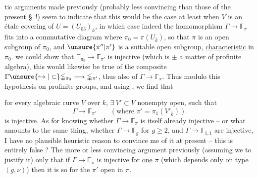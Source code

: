 
tic arguments made previously (probably less convincing than those of the present
\S~!) seem to indicate that this would be
the case at least when $V$ is an
étale covering of $U=(U_{03})_k$, in which
case indeed the homomorphism $\Gamma\longrightarrow\mathbb{\Gamma}_{\pi}$
fits into a commutative diagram
where $\pi_0=\pi(U_{\bar k})$, so that $\pi$ is an open subgroup of
$\pi_0$, and $\unsure{\pi''|\pi'}$ is a
suitable open subgroup, \uline{characteristic}
in $\pi_0$. \uline{} we could show that
$\mathbb{\Gamma}_{\pi_0}\longrightarrow\mathbb{\Gamma}_{\pi'}$ is injective
(which is $\pm$ a matter of profinite algebra), this would
likewise be true of the composite
$\Gamma\unsure{\hookrightarrow|\subset}\mathbb{\Gamma}_{\pi_0}
\longrightarrow\mathbb{\Gamma}_{\pi'}$,
thus also of $\Gamma\longrightarrow\mathbb{\Gamma}_{\pi}$.
Thus modulo this hypothesis on profinite groups,
and using , we find that

for every algebraic curve $V$ over $k$,
$\exists\ V'\subset V$ nonempty open, such that
\[
\Gamma\longrightarrow\mathbb{\Gamma}_{\pi'}
\qquad (\text{where }\pi'=\pi_1(V'_{\bar{k}}))
\]
is injective. As for knowing whether
$\Gamma\longrightarrow\mathbb{\Gamma}_{\pi}$ is itself already injective
-- or  what amounts to the same thing, whether
$\Gamma\longrightarrow\mathbb{\Gamma}_g$ for $g\geq 2$, and
$\Gamma\longrightarrow\mathbb{\Gamma}_{1,1}$ are injective,
I have no plausible heuristic reason to convince me of it at present
--  this is entirely false ? The
more or less convincing argument  previously (assuming we
 to justify it)  only that if
$\Gamma\longrightarrow\mathbb{\Gamma}_{\pi}$ is injective for
\uline{one} $\pi$ (which depends only on  type $(g,\nu)$)
then it is so for the $\pi'$ open in $\pi$.
 


